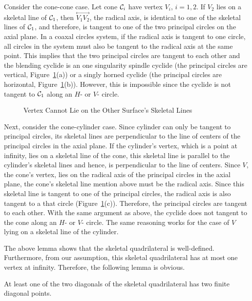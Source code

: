      Consider the cone-cone case.  Let cone ${\cal C}_i$ have vertex $V_i$,
$i=1,2$.  If $V_2$ lies on a skeletal line of ${\cal C}_1$, then
$\stackrel{\longleftrightarrow}{V_1V_2}$, the radical axis, is identical
to one of the skeletal lines of ${\cal C}_1$, and therefore, is tangent to
one of the two principal circles on the axial plane.  In a coaxal circles 
system, if the radical axis is tangent to one circle, all circles in the
system must also be
tangent to the radical axis at the same point.  This implies that the two
principal circles are tangent to each other and the blending cyclide is an
one singularity spindle cyclide (the principal circles are vertical,
Figure~\ref{fig:not-on-other-skeletal-line}(a)) or a singly horned cyclide 
(the principal circles are horizontal, 
Figure~\ref{fig:not-on-other-skeletal-line}(b)).  However, this is impossible
since the cyclide is not tangent to ${\cal C}_1$ along an $H$- or $V$- 
circle.
\begin{figure}
\vspace{6cm}
\caption{Vertex Cannot Lie on the Other Surface's Skeletal Lines}
\label{fig:not-on-other-skeletal-line}
\end{figure}

     Next, consider the cone-cylinder case.  Since cylinder can only be tangent
to principal circles, its skeletal lines are perpendicular to the line of
centers of the principal circles in the axial plane.  If the cylinder's vertex,
which is a point at infinity, lies on a skeletal line of the cone, this 
skeletal line is parallel to the cylinder's skeletal lines and hence,
is perpendicular to the line of centers.  Since $V$, the cone's vertex, lies on
the radical axis of the principal circles in the axial plane, the cone's
skeletal line mention above must be the radical axis. Since this skeletal line
is tangent to one of the principal circles, the radical axis is also tangent
to a that circle (Figure~\ref{fig:not-on-other-skeletal-line}(c)).  
Therefore, the principal circles are tangent to each other.
With the same argument as above, the cyclide does not tangent to the cone
along an $H$- or $V$- circle.  The same reasoning works for the case of $V$ 
lying on a skeletal line of the cylinder.  \QED

     The above lemma shows that the skeletal quadrilateral is well-defined.
Furthermore, from our assumption, this skeletal quadrilateral has at most one
vertex at infinity.  Therefore, the following lemma is obvious.

\begin{lemma}
\label{lemma:finite-d-points}
     At least one of the two diagonals of the skeletal quadrilateral has two 
finite diagonal points.
\end{lemma}

